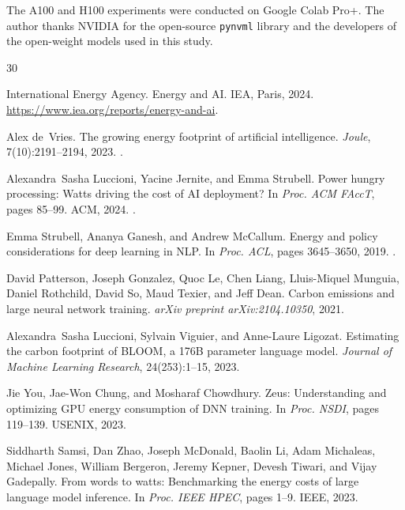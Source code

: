 \documentclass[acmlarge,manuscript,screen,review]{acmart}
\begin{document}
\begin{acks}
The A100 and H100 experiments were conducted on Google Colab Pro+. The author thanks NVIDIA for the open-source \texttt{pynvml} library and the developers of the open-weight models used in this study.
\end{acks}

\begin{thebibliography}{30}

International Energy Agency.
\newblock Energy and {AI}.
\newblock IEA, Paris, 2024.
\newblock \url{https://www.iea.org/reports/energy-and-ai}.

Alex de~Vries.
\newblock The growing energy footprint of artificial intelligence.
\newblock \emph{Joule}, 7(10):2191--2194, 2023.
\newblock {}.

Alexandra~Sasha Luccioni, Yacine Jernite, and Emma Strubell.
\newblock Power hungry processing: Watts driving the cost of {AI} deployment?
\newblock In \emph{Proc. ACM FAccT}, pages 85--99. ACM, 2024.
\newblock {}.

Emma Strubell, Ananya Ganesh, and Andrew McCallum.
\newblock Energy and policy considerations for deep learning in {NLP}.
\newblock In \emph{Proc. ACL}, pages 3645--3650, 2019.
\newblock {}.

David Patterson, Joseph Gonzalez, Quoc Le, Chen Liang, Lluis-Miquel Munguia, Daniel Rothchild, David So, Maud Texier, and Jeff Dean.
\newblock Carbon emissions and large neural network training.
\newblock \emph{arXiv preprint arXiv:2104.10350}, 2021.

Alexandra~Sasha Luccioni, Sylvain Viguier, and Anne-Laure Ligozat.
\newblock Estimating the carbon footprint of {BLOOM}, a 176{B} parameter language model.
\newblock \emph{Journal of Machine Learning Research}, 24(253):1--15, 2023.

Jie You, Jae-Won Chung, and Mosharaf Chowdhury.
\newblock Zeus: Understanding and optimizing {GPU} energy consumption of {DNN} training.
\newblock In \emph{Proc. NSDI}, pages 119--139. USENIX, 2023.

Siddharth Samsi, Dan Zhao, Joseph McDonald, Baolin Li, Adam Michaleas, Michael Jones, William Bergeron, Jeremy Kepner, Devesh Tiwari, and Vijay Gadepally.
\newblock From words to watts: Benchmarking the energy costs of large language model inference.
\newblock In \emph{Proc. IEEE HPEC}, pages 1--9. IEEE, 2023.


\end{thebibliography}
\end{document}
